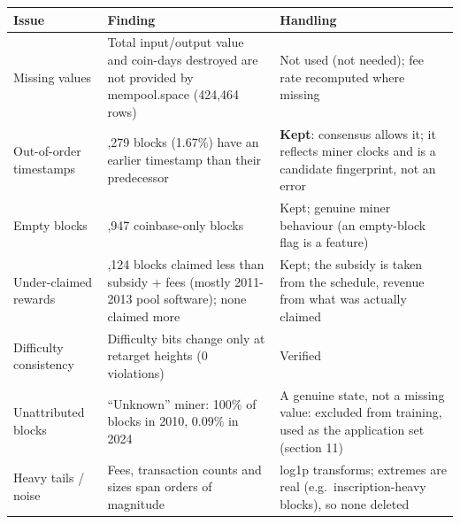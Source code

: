 \documentclass[
  11pt,
  a4paper,
]{article}
\newenvironment{reporttable}{\par\small\sffamily}{\par}
\begin{document}
\begin{reporttable}

\begin{longtable}[]{@{}
  >{\raggedright\arraybackslash}p{}
  >{\raggedright\arraybackslash}p{}
  >{\raggedright\arraybackslash}p{}@{}}
\toprule\noalign{}
\begin{minipage}[b]{\linewidth}\raggedright
\textbf{Issue}
\end{minipage} & \begin{minipage}[b]{\linewidth}\raggedright
\textbf{Finding}
\end{minipage} & \begin{minipage}[b]{\linewidth}\raggedright
\textbf{Handling}
\end{minipage} \\
\midrule\noalign{}
\endhead
\bottomrule\noalign{}
\endlastfoot
Missing values & Total input/output value and coin-days destroyed are
not provided by mempool.space (424,464 rows) & Not used (not needed);
fee rate recomputed where missing \\
Out-of-order timestamps & 16,279 blocks (1.67\%) have an earlier
timestamp than their predecessor & \textbf{Kept}: consensus allows it;
it reflects miner clocks and is a candidate fingerprint, not an error \\
Empty blocks & 89,947 coinbase-only blocks & Kept; genuine miner
behaviour (an empty-block flag is a feature) \\
Under-claimed rewards & 1,124 blocks claimed less than subsidy + fees
(mostly 2011-2013 pool software); none claimed more & Kept; the subsidy
is taken from the schedule, revenue from what was actually claimed \\
Difficulty consistency & Difficulty bits change only at retarget heights
(0 violations) & Verified \\
Unattributed blocks & ``Unknown'' miner: 100\% of blocks in 2010, 0.09\%
in 2024 & A genuine state, not a missing value: excluded from training,
used as the application set (section 11) \\
Heavy tails / noise & Fees, transaction counts and sizes span orders of
magnitude & log1p transforms; extremes are real (e.g.~inscription-heavy
blocks), so none deleted \\
\end{longtable}

\end{reporttable}
\end{document}
